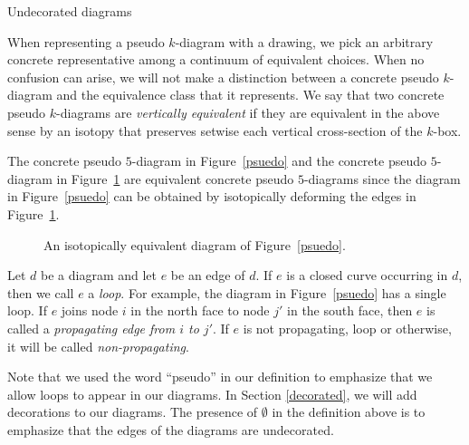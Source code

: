 \begin{section}{Undecorated diagrams}
\begin{remark}\label{vertequiv}
When representing a pseudo $k$-diagram with a drawing, we pick an arbitrary concrete representative among a continuum of equivalent choices. When no confusion can arise, we will not make a distinction between a concrete pseudo $k$-diagram and the equivalence class that it represents. We say that two concrete pseudo $k$-diagrams are \emph{vertically equivalent} if they are equivalent in the above sense by an isotopy that preserves setwise each vertical cross-section of the $k$-box.
\end{remark}

\begin{example}
The concrete pseudo $5$-diagram in Figure~\ref{psuedo} and the concrete pseudo $5$-diagram in Figure~\ref{equivpseudo} are equivalent concrete pseudo $5$-diagrams since the diagram in Figure~\ref{psuedo} can be obtained by isotopically deforming the edges in Figure~\ref{equivpseudo}.

\begin{figure}[!h]
\centering
{}
\caption{An isotopically equivalent diagram of Figure~\ref{psuedo}.}
\label{equivpseudo}
\end{figure}
\end{example}

Let $d$ be a diagram and let $e$ be an edge of $d$. If $e$ is a closed curve occurring in $d$, then we call $e$ a \emph{loop}.  For example, the diagram in Figure~\ref{psuedo} has a single loop.  If $e$ joins node $i$ in the north face to node $j'$ in the south face, then $e$ is called a \emph{propagating edge from $i$ to $j'$}. If $e$ is not propagating, loop or otherwise, it will be called \emph{non-propagating}.  

Note that we used the word ``pseudo'' in our definition to emphasize that we allow loops to appear in our diagrams. In Section \ref{decorated}, we will add decorations to our diagrams. The presence of $\emptyset$ in the definition above is to emphasize that the edges of the diagrams are undecorated.



\end{section}
